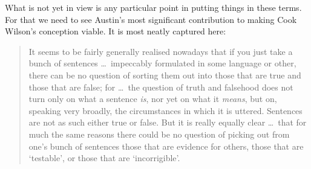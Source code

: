 What is not yet in view is any particular point in putting things in these terms. For that we need to see Austin's most significant contribution to making Cook Wilson's conception viable. It is most neatly captured here:
\begin{quote}
	It seems to be fairly generally realised nowadays that if you just take a bunch of sentences \ldots\ impeccably formulated in some language or other, there can be no question of sorting them out into those that are true and those that are false; for \ldots\ the question of truth and falsehood does not turn only on what a sentence \emph{is}, nor yet on what it \emph{means}, but on, speaking very broadly, the circumstances in which it is uttered. Sentences are not as such either true or false. But it is really equally clear \ldots\ that for much the same reasons there could be no question of picking out from one’s bunch of sentences those that are evidence for others, those that are `testable', or those that are `incorrigible'. \citep[110--111]{Austin:1962lr}
\end{quote}
